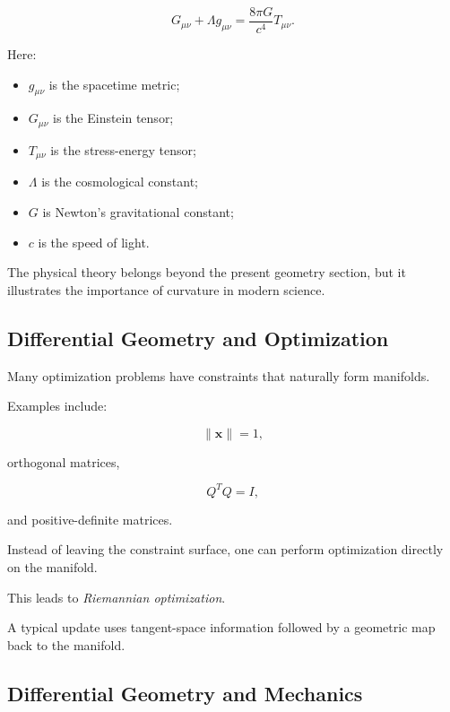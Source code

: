 \[
\boxed{
G_{\mu\nu}
+
\Lambda g_{\mu\nu}
=
\frac{8\pi G}{c^4}
T_{\mu\nu}.
}
\]

Here:

\begin{itemize}
    \item \(g_{\mu\nu}\) is the spacetime metric;
    \item \(G_{\mu\nu}\) is the Einstein tensor;
    \item \(T_{\mu\nu}\) is the stress-energy tensor;
    \item \(\Lambda\) is the cosmological constant;
    \item \(G\) is Newton's gravitational constant;
    \item \(c\) is the speed of light.
\end{itemize}

The physical theory belongs beyond the present geometry section, but it
illustrates the importance of curvature in modern science.

\subsection{Differential Geometry and Optimization}
\label{subsec:differential-geometry-optimization}

Many optimization problems have constraints that naturally form manifolds.

Examples include:

\[
\|\mathbf{x}\|=1,
\]

orthogonal matrices,

\[
Q^TQ=I,
\]

and positive-definite matrices.

Instead of leaving the constraint surface, one can perform optimization
directly on the manifold.

This leads to \emph{Riemannian optimization}.

A typical update uses tangent-space information followed by a geometric map
back to the manifold.

\subsection{Differential Geometry and Mechanics}
\label{subsec:differential-geometry-mechanics}

